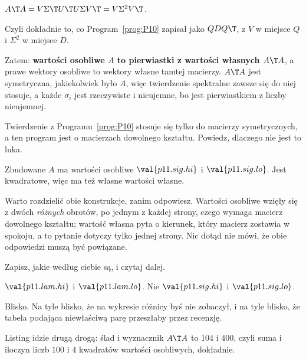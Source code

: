 \begin{fr}
\begin{ansblock}
$A\T A = V\Sigma\T U\T U \Sigma V\T = V\Sigma^{2}V\T$.
\end{ansblock}

Czyli dokładnie to, co Program~\ref{prog:P10} zapisał jako $QDQ\T$, z $V$ w
miejsce $Q$ i $\Sigma^{2}$ w miejsce $D$.

Zatem: \textbf{wartości osobliwe $A$ to pierwiastki z wartości własnych
$A\T A$}, a prawe wektory osobliwe to wektory własne tamtej macierzy. $A\T A$
jest symetryczna, jakiekolwiek było $A$, więc twierdzenie spektralne zawsze się
do niej stosuje, a każde $\sigma_i$ jest rzeczywiste i nieujemne, bo jest
pierwiastkiem z liczby nieujemnej.

Twierdzenie z Programu~\ref{prog:P10} stosuje się tylko do macierzy
symetrycznych, a ten program jest o macierzach dowolnego kształtu. Powiedz,
dlaczego nie jest to luka.
\dotline
\nextframe
\end{fr}

\begin{fr}
Zbudowane $A$ ma wartości osobliwe $\val{p11.sig.hi}$ i $\val{p11.sig.lo}$.
Jest kwadratowe, więc ma też własne wartości własne.

Warto rozdzielić obie konstrukcje, zanim odpowiesz. Wartości osobliwe wzięły
się z dwóch \emph{różnych} obrotów, po jednym z każdej strony, czego wymaga
macierz dowolnego kształtu; wartość własna pyta o kierunek, który macierz
zostawia w spokoju, a to pytanie dotyczy tylko jednej strony. Nic dotąd nie
mówi, że obie odpowiedzi muszą być powiązane.

Zapisz, jakie według ciebie są, i czytaj dalej.
\dotline
\nextframe
\end{fr}

\begin{fr}
\begin{ansblock}
$\val{p11.lam.hi}$ i $\val{p11.lam.lo}$. Nie $\val{p11.sig.hi}$ i
$\val{p11.sig.lo}$.
\end{ansblock}

Blisko. Na tyle blisko, że na wykresie różnicy byś nie zobaczył, i na tyle
blisko, że tabela podająca niewłaściwą parę przeszłaby przez recenzję.


Listing idzie drugą drogą: ślad i wyznacznik $A\T A$ to $104$ i $400$, czyli
suma i iloczyn liczb $100$ i $4$ \dash{} kwadratów wartości osobliwych,
dokładnie.
\end{fr}

